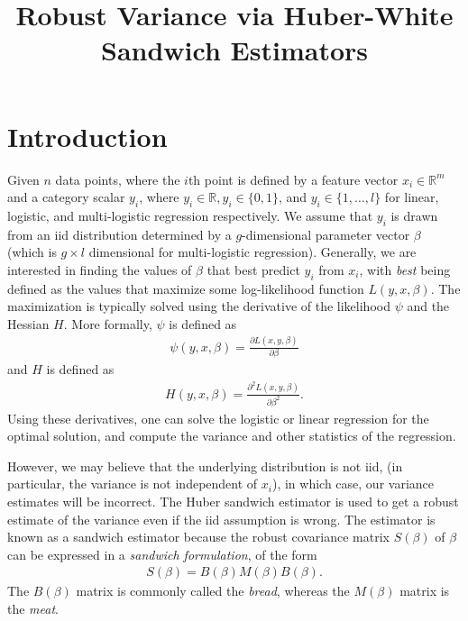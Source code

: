 \documentclass[12pt]{article}
\title{Robust Variance via Huber-White Sandwich Estimators}
\begin{document}
\maketitle

\section{Introduction}
Given  $n$ data points, where the $i$th point is defined by a feature  vector $x_i \in \mathbb{R}^m$ and a category scalar $y_i$, where $y_i \in \mathbb{R}, y_i \in \{0,1 \}$, and $y_i \in \{1,\dots, l \}$ for linear, logistic, and multi-logistic regression respectively.  We assume that $y_i$ is drawn from an iid distribution determined by a $g$-dimensional parameter vector $\beta$ (which is $g\times l$ dimensional for multi-logistic regression).  Generally, we are interested in finding the values of $\beta$ that best predict $y_i$ from $x_i$, with \textit{best} being defined as the values that maximize some log-likelihood function $L(y,x,\beta)$.  The maximization is typically solved using the derivative of the likelihood $\psi$  and the Hessian $H$.  More formally, $\psi$ is defined as 
\begin{align}
\psi(y,x, \beta) = \frac{\partial L(x,y,\beta)}{\partial \beta}
\end{align} 
and $H$ is defined as
\begin{align}
H(y,x, \beta) = \frac{\partial^2 L(x,y,\beta)}{\partial \beta^2}.
\end{align} 
Using these derivatives, one can solve the logistic or linear regression for the optimal solution, and compute the variance and other statistics of the regression.  


However, we may believe that the underlying distribution is not iid, (in particular, the variance is not independent of $x_i$), in which case, our variance estimates will be incorrect. 
 The Huber sandwich estimator is used to get a robust estimate of the variance even if the iid assumption is wrong.  The estimator is known as a sandwich estimator because the robust covariance matrix $S(\beta)$ of $\beta$ can be expressed in a \textit{sandwich formulation}, of the form
\begin{align}
S(\beta) = B(\beta) M(\beta) B(\beta).  
\end{align}
The $B(\beta)$ matrix is commonly called the \textit{bread}, whereas the $M(\beta)$ matrix is the \textit{meat}.  
\end{document}
